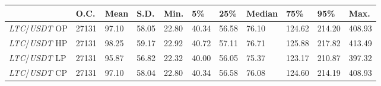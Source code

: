 \begin{tabular}{lllllllllll}
\toprule
 & \textbf{O.C.} & \textbf{Mean} & \textbf{S.D.} & \textbf{Min.} & \textbf{5\%} & \textbf{25\%} & \textbf{Median} & \textbf{75\%} & \textbf{95\%} & \textbf{Max.} \\
\midrule
\emph{LTC}/\emph{USDT} OP & 27131 & 97.10 & 58.05 & 22.80 & 40.34 & 56.58 & 76.10 & 124.62 & 214.20 & 408.93 \\
\emph{LTC}/\emph{USDT} HP & 27131 & 98.25 & 59.17 & 22.92 & 40.72 & 57.11 & 76.71 & 125.88 & 217.82 & 413.49 \\
\emph{LTC}/\emph{USDT} LP & 27131 & 95.87 & 56.82 & 22.32 & 40.00 & 56.05 & 75.37 & 123.17 & 210.87 & 397.32 \\
\emph{LTC}/\emph{USDT} CP & 27131 & 97.10 & 58.04 & 22.80 & 40.34 & 56.58 & 76.08 & 124.60 & 214.19 & 408.93 \\
\bottomrule
\end{tabular}
